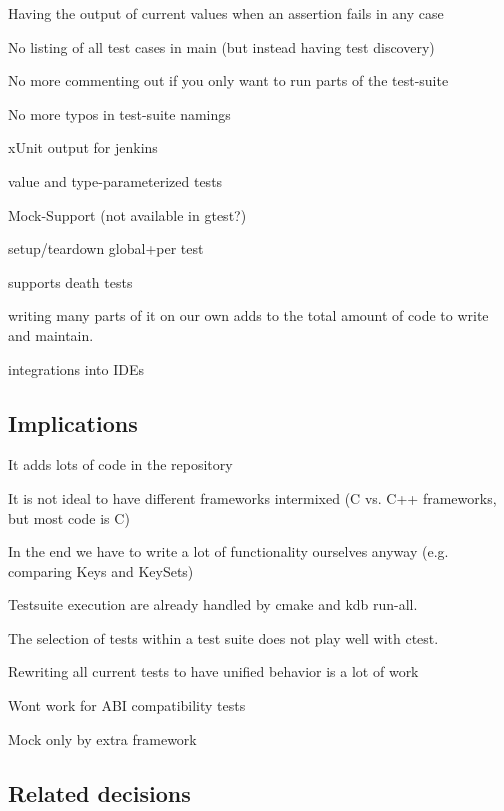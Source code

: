 \begin{DoxyItemize}
\item Having the output of current values when an assertion fails in any case
\item No listing of all test cases in main (but instead having test discovery)
\item No more commenting out if you only want to run parts of the test-\/suite
\item No more typos in test-\/suite namings
\item x\+Unit output for jenkins
\item value and type-\/parameterized tests
\item Mock-\/\+Support (not available in gtest?)
\item setup/teardown global+per test
\item supports death tests
\item writing many parts of it on our own adds to the total amount of code to write and maintain.
\item integrations into I\+D\+Es
\end{DoxyItemize}

\subsection*{Implications}


\begin{DoxyItemize}
\item It adds lots of code in the repository
\item It is not ideal to have different frameworks intermixed (C vs. C++ frameworks, but most code is C)
\item In the end we have to write a lot of functionality ourselves anyway (e.\+g. comparing Keys and Key\+Sets)
\item Testsuite execution are already handled by cmake and kdb run-\/all.
\item The selection of tests within a test suite does not play well with ctest.
\item Rewriting all current tests to have unified behavior is a lot of work
\item Wont work for A\+BI compatibility tests
\item Mock only by extra framework
\end{DoxyItemize}

\subsection*{Related decisions}


